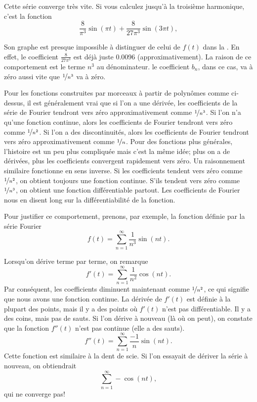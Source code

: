 \begin{example}
Cette série converge très vite.
Si vous calculez jusqu'à la troisième harmonique, c'est la fonction
\begin{equation*}
\frac{8}{\pi^3} \sin (\pi t) + 
\frac{8}{27 \pi^3} \sin (3 \pi t) ,
\end{equation*}

Son graphe est presque impossible à distinguer de celui de $f(t)$ dans la 
.
En effet, le coefficient
$\frac{8}{27 \pi^3}$ est déjà juste 0.0096 (approximativement).
La raison de ce comportement est le terme $n^3$ au dénominateur.
le coefficient $b_n$, dans ce cas, va à zéro aussi vite que
$\nicefrac{1}{n^3}$ va à zéro.
\end{example}

Pour les fonctions construites par morceaux à partir de polynômes comme ci-dessus,
il est généralement vrai que si l'on a une dérivée, les coefficients de la série de Fourier
tendront vers zéro approximativement comme $\nicefrac{1}{n^3}$.  Si l'on n'a
 qu'une fonction continue, alors les coefficients de Fourier tendront vers zéro comme $\nicefrac{1}{n^2}$.  Si l'on a des discontinuités, alors
les coefficients de Fourier tendront vers zéro approximativement comme $\nicefrac{1}{n}$.
Pour des fonctions plus générales, l'histoire est un peu plus compliquée mais c'est la
même idée; plus on a de dérivées, plus les coefficients convergent rapidement vers zéro. Un raisonnement similaire fonctionne en sens inverse. Si les coefficients tendent vers 
zéro comme $\nicefrac{1}{n^2}$, on obtient toujours une fonction continue. S'ils tendent vers zéro comme $\nicefrac{1}{n^3}$, 
on obtient une fonction différentiable partout.  Les coefficients de Fourier nous en disent long sur la différentiabilité de la fonction. 

Pour justifier ce comportement, prenons, par exemple, la fonction définie par
la série Fourier
\begin{equation*}
f(t) = \sum_{n=1}^\infty \frac{1}{n^3} \sin (n t) .
\end{equation*}

Lorsqu'on dérive terme par terme, on remarque
\begin{equation*}
f'(t) = \sum_{n=1}^\infty \frac{1}{n^2} \cos (n t) .
\end{equation*}
Par conséquent, les coefficients diminuent maintenant comme $\nicefrac{1}{n^2}$, ce qui 
signifie que nous avons une fonction continue.
La dérivée de $f'(t)$ est définie à la plupart des points, mais il y a des points où $f'(t)$ n'est pas différentiable.
Il y a des coins, mais pas de sauts.
Si l'on dérive à nouveau (là où on peut), on constate que la fonction
$f''(t)$ n'est pas continue (elle a des sauts).
\begin{equation*}
f''(t) = \sum_{n=1}^\infty \frac{-1}{n} \sin (n t) .
\end{equation*}
Cette fonction est similaire à la dent de scie. Si l'on essayait de dériver 
la série à nouveau, on obtiendrait
\begin{equation*}
\sum_{n=1}^\infty -\cos (n t) ,
\end{equation*}
qui ne converge pas!

